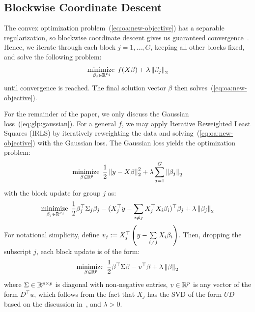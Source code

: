 \subsection{Blockwise Coordinate Descent}\label{ssec:bcd}

The convex optimization problem~(\ref{eq:oa:new-objective}) has a separable regularization,
so blockwise coordinate descent gives us guaranteed convergence~\citep{tseng:2001}.
Hence, we iterate through each block $j=1,\ldots, G$,
keeping all other blocks fixed, and solve the following problem:
\begin{align}
    \operatorname*{minimize\;}_{\beta_j \in \mathbb{R}^{p_j}}
    f(X\beta)
    + \lambda \left\|\beta_j\right\|_2
    \label{eq:bcd:block-problem}
\end{align}
until convergence is reached.
The final solution vector $\beta$ then solves~(\ref{eq:oa:new-objective}).

For the remainder of the paper, we only discuss the Gaussian loss~(\ref{eq:glp:gaussian}).
For a general $f$, we may apply Iterative Reweighted Least Squares (IRLS) 
by iteratively reweighting the data 
and solving~(\ref{eq:oa:new-objective}) with the Gaussian loss.
The Gaussian loss yields the optimization problem:
\begin{align*}
    \operatorname*{minimize\;}_{\beta \in \mathbb{R}^p}
    \frac{1}{2} \left\|y - X \beta\right\|_2^2 
    + \lambda \sum\limits_{j=1}^G \left\|\beta_j\right\|_2
\end{align*}
with the block update for group $j$ as:
\begin{align*}
    \operatorname*{minimize\;}_{\beta_j \in \mathbb{R}^{p_j}}
    \frac{1}{2} \beta_j^\top \Sigma_j \beta_j
    - (X_j^\top y - \sum\limits_{i \neq j} X_j^\top X_i \beta_i)^\top \beta_j
    + \lambda \left\|\beta_j\right\|_2
\end{align*}
For notational simplicity, define $v_j := X_j^\top \left(y - \sum\limits_{i \neq j} X_i \beta_i\right)$.
Then, dropping the subscript $j$, each block update is of the form:
\begin{align}
    \operatorname*{minimize\;}_{\beta \in \mathbb{R}^p}
    \frac{1}{2} \beta^\top \Sigma \beta
    - v^\top \beta
    + \lambda \left\|\beta\right\|_2
    \label{eq:bcd:block-update}
\end{align}
where $\Sigma \in \mathbb{R}^{p \times p}$ is diagonal with non-negative entries,
$v \in \mathbb{R}^p$ is any vector of the form $D^\top u$,
which follows from the fact that $X_j$ has the SVD of the form $U D$ 
based on the discussion in~,
and $\lambda > 0$.
